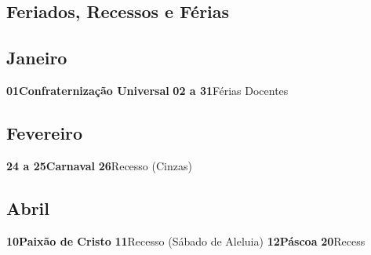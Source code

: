 \documentclass[thesis]{hmcposter}
\begin{document}
\begin{poster}
\newpage\onespacing \small \section{\color{hmcorange}Feriados, Recessos e Férias}\subsection{Janeiro}\textbf{01}\quad \quad \quad \quad \textbf{Confraternização Universal} \newline\textbf{02 a 31}\quad \quad Férias Docentes \newline\subsection{Fevereiro}\textbf{24 a 25}\quad \quad \textbf{Carnaval} \newline\textbf{26}\quad \quad \quad \quad Recesso (Cinzas) \newline\subsection{Abril}\textbf{10}\quad \quad \quad \quad \textbf{Paixão de Cristo} \newline\textbf{11}\quad \quad \quad \quad Recesso (Sábado de Aleluia) \newline\textbf{12}\quad \quad \quad \quad \textbf{Páscoa} \newline\textbf{20}\quad \quad \quad \quad Recess
\end{poster}
\end{document}
